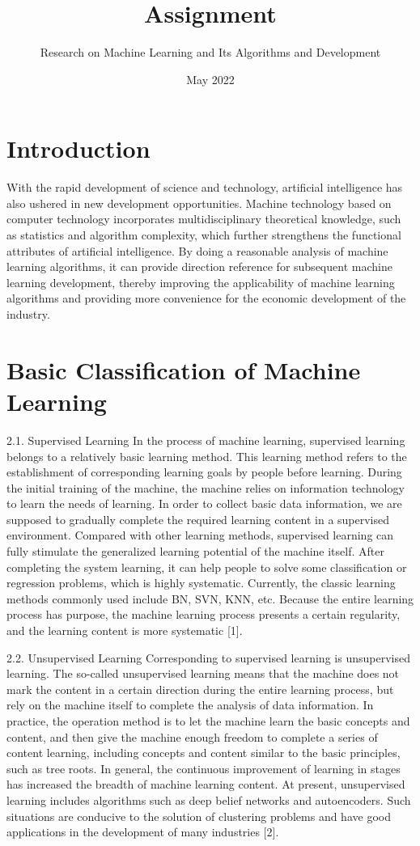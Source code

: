 \documentclass{article}
\title{Assignment}
\author{Research on Machine Learning and Its Algorithms and 
Development}
\date{May 2022}
\begin{document}
\maketitle

\section{Introduction}
With the rapid development of science and technology, artificial intelligence has also ushered in new 
development opportunities. Machine technology based on computer technology incorporates 
multidisciplinary theoretical knowledge, such as statistics and algorithm complexity, which further 
strengthens the functional attributes of artificial intelligence. By doing a reasonable analysis of 
machine learning algorithms, it can provide direction reference for subsequent machine learning 
development, thereby improving the applicability of machine learning algorithms and providing more 
convenience for the economic development of the industry.
\section{Basic Classification of Machine Learning
}
2.1. Supervised Learning
In the process of machine learning, supervised learning belongs to a relatively basic learning method. 
This learning method refers to the establishment of corresponding learning goals by people before 
learning. During the initial training of the machine, the machine relies on information technology to 
learn the needs of learning. In order to collect basic data information, we are supposed to gradually 
complete the required learning content in a supervised environment. Compared with other learning 
methods, supervised learning can fully stimulate the generalized learning potential of the machine 
itself. After completing the system learning, it can help people to solve some classification or 
regression problems, which is highly systematic. Currently, the classic learning methods commonly 
used include BN, SVN, KNN, etc. Because the entire learning process has purpose, the machine 
learning process presents a certain regularity, and the learning content is more systematic [1].

2.2. Unsupervised Learning
Corresponding to supervised learning is unsupervised learning. The so-called unsupervised learning 
means that the machine does not mark the content in a certain direction during the entire learning 
process, but rely on the machine itself to complete the analysis of data information. In practice, the 
operation method is to let the machine learn the basic concepts and content, and then give the machine 
enough freedom to complete a series of content learning, including concepts and content similar to the 
basic principles, such as tree roots. In general, the continuous improvement of learning in stages has 
increased the breadth of machine learning content. At present, unsupervised learning includes 
algorithms such as deep belief networks and autoencoders. Such situations are conducive to the 
solution of clustering problems and have good applications in the development of many industries [2].
\end{document}
